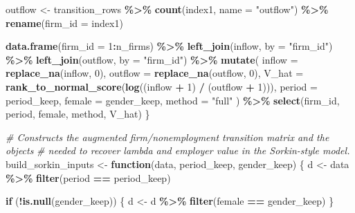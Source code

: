 \documentclass[
]{article}
\newenvironment{Shaded}{\begin{snugshade}}{\end{snugshade}}
\newcommand{\AttributeTok}[1]{\textcolor[rgb]{0.13,0.29,0.53}{#1}}
\newcommand{\CommentTok}[1]{\textcolor[rgb]{0.56,0.35,0.01}{\textit{#1}}}
\newcommand{\ControlFlowTok}[1]{\textcolor[rgb]{0.13,0.29,0.53}{\textbf{#1}}}
\newcommand{\DecValTok}[1]{\textcolor[rgb]{0.00,0.00,0.81}{#1}}
\newcommand{\FunctionTok}[1]{\textcolor[rgb]{0.13,0.29,0.53}{\textbf{#1}}}
\newcommand{\NormalTok}[1]{#1}
\newcommand{\OtherTok}[1]{\textcolor[rgb]{0.56,0.35,0.01}{#1}}
\newcommand{\SpecialCharTok}[1]{\textcolor[rgb]{0.81,0.36,0.00}{\textbf{#1}}}
\newcommand{\StringTok}[1]{\textcolor[rgb]{0.31,0.60,0.02}{#1}}
\begin{document}
\begin{Shaded}
\begin{Highlighting}[]
\NormalTok{    outflow }\OtherTok{\textless{}{-}}\NormalTok{ transition\_rows }\SpecialCharTok{\%\textgreater{}\%}
        \FunctionTok{count}\NormalTok{(index1, }\AttributeTok{name =} \StringTok{"outflow"}\NormalTok{) }\SpecialCharTok{\%\textgreater{}\%}
        \FunctionTok{rename}\NormalTok{(}\AttributeTok{firm\_id =}\NormalTok{ index1)}

    \FunctionTok{data.frame}\NormalTok{(}\AttributeTok{firm\_id =} \DecValTok{1}\SpecialCharTok{:}\NormalTok{n\_firms) }\SpecialCharTok{\%\textgreater{}\%}
        \FunctionTok{left\_join}\NormalTok{(inflow, }\AttributeTok{by =} \StringTok{"firm\_id"}\NormalTok{) }\SpecialCharTok{\%\textgreater{}\%}
        \FunctionTok{left\_join}\NormalTok{(outflow, }\AttributeTok{by =} \StringTok{"firm\_id"}\NormalTok{) }\SpecialCharTok{\%\textgreater{}\%}
        \FunctionTok{mutate}\NormalTok{(}
            \AttributeTok{inflow =} \FunctionTok{replace\_na}\NormalTok{(inflow, }\DecValTok{0}\NormalTok{),}
            \AttributeTok{outflow =} \FunctionTok{replace\_na}\NormalTok{(outflow, }\DecValTok{0}\NormalTok{),}
            \AttributeTok{V\_hat =} \FunctionTok{rank\_to\_normal\_score}\NormalTok{(}\FunctionTok{log}\NormalTok{((inflow }\SpecialCharTok{+} \DecValTok{1}\NormalTok{) }\SpecialCharTok{/}\NormalTok{ (outflow }\SpecialCharTok{+} \DecValTok{1}\NormalTok{))),}
            \AttributeTok{period =}\NormalTok{ period\_keep,}
            \AttributeTok{female =}\NormalTok{ gender\_keep,}
            \AttributeTok{method =} \StringTok{"full"}
\NormalTok{        ) }\SpecialCharTok{\%\textgreater{}\%}
        \FunctionTok{select}\NormalTok{(firm\_id, period, female, method, V\_hat)}
\NormalTok{\}}

\CommentTok{\# Constructs the augmented firm/nonemployment transition matrix and the objects}
\CommentTok{\# needed to recover lambda and employer value in the Sorkin{-}style model.}
\NormalTok{build\_sorkin\_inputs }\OtherTok{\textless{}{-}} \ControlFlowTok{function}\NormalTok{(data, period\_keep, gender\_keep) \{}
\NormalTok{    d }\OtherTok{\textless{}{-}}\NormalTok{ data }\SpecialCharTok{\%\textgreater{}\%}
        \FunctionTok{filter}\NormalTok{(period }\SpecialCharTok{==}\NormalTok{ period\_keep)}

    \ControlFlowTok{if}\NormalTok{ (}\SpecialCharTok{!}\FunctionTok{is.null}\NormalTok{(gender\_keep)) \{}
\NormalTok{        d }\OtherTok{\textless{}{-}}\NormalTok{ d }\SpecialCharTok{\%\textgreater{}\%} \FunctionTok{filter}\NormalTok{(female }\SpecialCharTok{==}\NormalTok{ gender\_keep)}
\NormalTok{    \}}


\end{Highlighting}
\end{Shaded}
\end{document}
